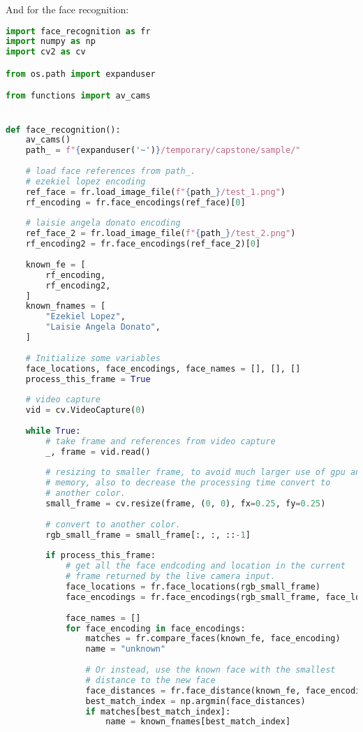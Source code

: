\documentclass[12pt]{article}
\begin{document}
And for the face recognition:

\singlespacing
\begin{lstlisting}[language=Python, caption={\texttt{code\_email.py}}]
import face_recognition as fr
import numpy as np
import cv2 as cv

from os.path import expanduser

from functions import av_cams


def face_recognition():
	av_cams()
	path_ = f"{expanduser('~')}/temporary/capstone/sample/"
	
	# load face references from path_.
	# ezekiel lopez encoding
	ref_face = fr.load_image_file(f"{path_}/test_1.png")    
	rf_encoding = fr.face_encodings(ref_face)[0]
	
	# laisie angela donato encoding
	ref_face_2 = fr.load_image_file(f"{path_}/test_2.png")
	rf_encoding2 = fr.face_encodings(ref_face_2)[0]
	
	known_fe = [
		rf_encoding,
		rf_encoding2,    
	]
	known_fnames = [
		"Ezekiel Lopez",
		"Laisie Angela Donato",
	]
	
	# Initialize some variables
	face_locations, face_encodings, face_names = [], [], []     
	process_this_frame = True
	
	# video capture
	vid = cv.VideoCapture(0)
	
	while True:   
		# take frame and references from video capture
		_, frame = vid.read()
		
		# resizing to smaller frame, to avoid much larger use of gpu and 
		# memory, also to decrease the processing time convert to
		# another color.
		small_frame = cv.resize(frame, (0, 0), fx=0.25, fy=0.25)
		
		# convert to another color.
		rgb_small_frame = small_frame[:, :, ::-1]
		
		if process_this_frame:
			# get all the face endcoding and location in the current 
			# frame returned by the live camera input.
			face_locations = fr.face_locations(rgb_small_frame)
			face_encodings = fr.face_encodings(rgb_small_frame, face_locations)
			
			face_names = []
			for face_encoding in face_encodings:
				matches = fr.compare_faces(known_fe, face_encoding)
				name = "unknown"
				
				# Or instead, use the known face with the smallest
				# distance to the new face
				face_distances = fr.face_distance(known_fe, face_encoding)
				best_match_index = np.argmin(face_distances)
				if matches[best_match_index]:
					name = known_fnames[best_match_index]
				

\end{lstlisting}
\end{document}
